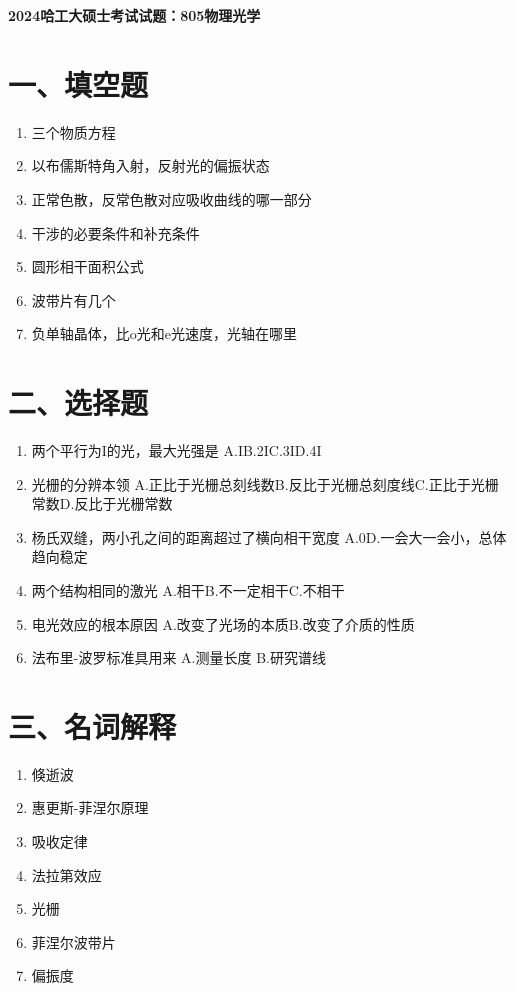 \documentclass[12pt, a4paper]{article}
\theoremstyle{solution}
\begin{document}
\begin{center}
\Large\textbf{2024哈工大硕士考试试题：805物理光学}
\end{center}





\section*{一、填空题}
\begin{enumerate}
    \item 三个物质方程
    \item 以布儒斯特角入射，反射光的偏振状态
    \item 正常色散，反常色散对应吸收曲线的哪一部分
    \item 干涉的必要条件和补充条件
    \item 圆形相干面积公式
    \item 波带片有几个
    \item 负单轴晶体，比o光和e光速度，光轴在哪里
\end{enumerate}
\section*{二、选择题}
\begin{enumerate}
    \item 两个平行为I的光，最大光强是
    A.I\quad B.2I\quad C.3I\quad D.4I
    \item 光栅的分辨本领
    A.正比于光栅总刻线数\quad B.反比于光栅总刻度线\quad C.正比于光栅常数\quad D.反比于光栅常数
    \item 杨氏双缝，两小孔之间的距离超过了横向相干宽度
    A.0\quad D.一会大一会小，总体趋向稳定
    \item 两个结构相同的激光
    A.相干\quad B.不一定相干\quad C.不相干
    \item 电光效应的根本原因
    A.改变了光场的本质\quad B.改变了介质的性质
    \item 法布里-波罗标准具用来
    A.测量长度 \quad B.研究谱线
\end{enumerate}
\section*{三、名词解释}
\begin{enumerate}
    \item 倏逝波
    \item 惠更斯-菲涅尔原理
    \item 吸收定律
    \item 法拉第效应
    \item 光栅
    \item 菲涅尔波带片
    \item 偏振度
\end{enumerate}
\end{document}
